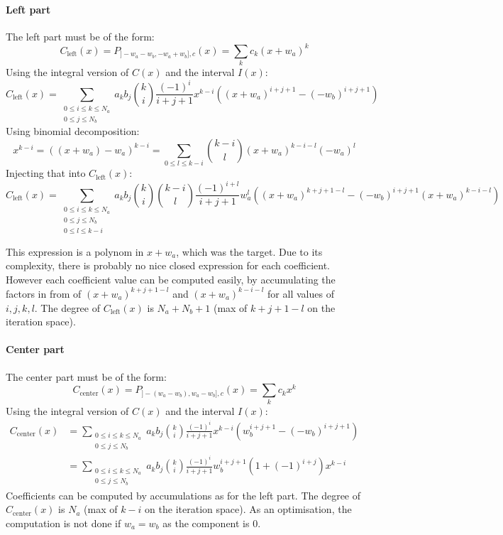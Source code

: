 \documentclass[a4paper,10pt]{article}
\begin{document}
\paragraph{Left part}
The left part must be of the form:
\[
	C_\text{left}(x) = P_{]-w_a-w_b, -w_a+w_b], c}(x) = \sum_k c_k (x + w_a)^k
\]
Using the integral version of $C(x)$ and the interval $I(x)$:
\[
    C_\text{left}(x) = \sum_{\substack{0 \le i \le k \le N_a \\ 0 \le j \le N_b}}
    a_k b_j \binom{k}{i} \frac{(-1)^i}{i+j+1} x^{k-i} \left( (x+w_a)^{i+j+1} - (-w_b)^{i+j+1} \right)
\]
Using binomial decomposition:
\[
	x^{k-i} = ((x+w_a) - w_a)^{k-i} = \sum_{0 \le l \le k-i} \binom{k-i}{l} (x+w_a)^{k-i-l} (-w_a)^l
\]
Injecting that into $C_\text{left}(x)$:
\[
    C_\text{left}(x) = \sum_{\substack{0 \le i \le k \le N_a \\ 0 \le j \le N_b \\ 0 \le l \le k-i}}
    a_k b_j \binom{k}{i} \binom{k-i}{l} \frac{(-1)^{i+l}}{i+j+1} w_a^l \left( (x+w_a)^{k+j+1-l} - (-w_b)^{i+j+1} (x+w_a)^{k-i-l} \right)
\]

This expression is a polynom in $x+w_a$, which was the target.
Due to its complexity, there is probably no nice closed expression for each coefficient.
However each coefficient value can be computed easily, by accumulating the factors in from of $(x+w_a)^{k+j+1-l}$ and $(x+w_a)^{k-i-l}$ for all values of $i,j,k,l$.
The degree of $C_\text{left}(x)$ is $N_a + N_b + 1$ (max of $k+j+1-l$ on the iteration space).

\paragraph{Center part}
The center part must be of the form:
\[
	C_\text{center}(x) = P_{]-(w_a-w_b), w_a-w_b], c}(x) = \sum_k c_k x^k
\]
Using the integral version of $C(x)$ and the interval $I(x)$:
\[ \begin{split}
    C_\text{center}(x)
    &= \sum_{\substack{0 \le i \le k \le N_a \\ 0 \le j \le N_b}} a_k b_j \binom{k}{i} \frac{(-1)^i}{i+j+1} x^{k-i} \left( w_b^{i+j+1} - (-w_b)^{i+j+1} \right) \\
    &= \sum_{\substack{0 \le i \le k \le N_a \\ 0 \le j \le N_b}} a_k b_j \binom{k}{i} \frac{(-1)^i}{i+j+1} w_b^{i+j+1} (1 + (-1)^{i+j}) x^{k-i}
\end{split} \]
Coefficients can be computed by accumulations as for the left part.
The degree of $C_\text{center}(x)$ is $N_a$ (max of $k-i$ on the iteration space).
As an optimisation, the computation is not done if $w_a = w_b$ as the component is $0$.
\end{document}
